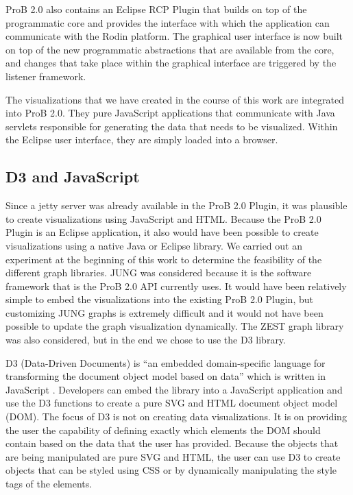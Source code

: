ProB 2.0 also contains an Eclipse RCP Plugin that builds on top of the programmatic core and provides the interface with which the application can communicate with the Rodin platform. The graphical user interface is now built on top of the new programmatic abstractions that are available from the core, and changes that take place within the graphical interface are triggered by the listener framework.

The visualizations that we have created in the course of this work are integrated into ProB 2.0. They pure JavaScript applications that communicate with Java servlets responsible for generating the data that needs to be visualized. Within the Eclipse user interface, they are simply loaded into a browser.

\subsection{D3 and JavaScript}

Since a jetty server was already available in the ProB 2.0 Plugin, it was plausible to create visualizations using JavaScript and HTML. Because the ProB 2.0 Plugin is an Eclipse application, it also would have been possible to create visualizations using a native Java or Eclipse library. We carried out an experiment at the beginning of this work to determine the feasibility of the different graph libraries. JUNG was considered because it is the software framework that is the ProB 2.0 API currently uses. It would have been relatively simple to embed the visualizations into the existing ProB 2.0 Plugin, but customizing JUNG graphs is extremely difficult and it would not have been possible to update the graph visualization dynamically. The ZEST graph library was also considered, but in the end we chose to use the D3 library. 

D3 (Data-Driven Documents) is ``an embedded domain-specific language for transforming
the document object model based on data'' which is written in JavaScript \cite{2011-d3}. Developers can embed the library into a JavaScript application and use the D3 functions to create a pure SVG and HTML document object model (DOM). The focus of D3 is not on creating data visualizations. It is on providing the user the capability of defining exactly which elements the DOM should contain based on the data that the user has provided. Because the objects that are being manipulated are pure SVG and HTML, the user can use D3 to create objects that can be styled using CSS or by dynamically manipulating the style tags of the elements.

